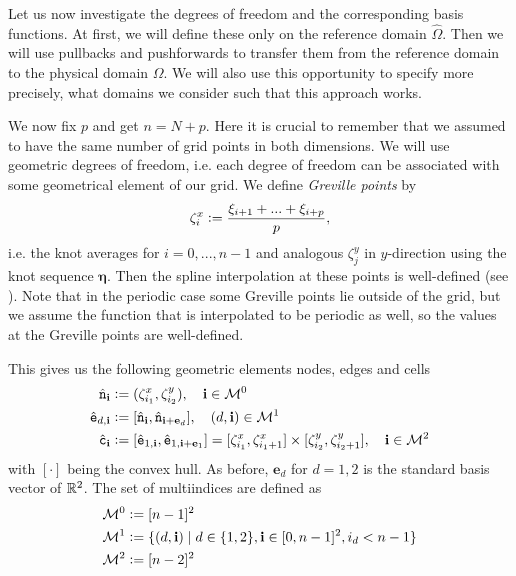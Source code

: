 \documentclass[../master_thesis.tex]{subfiles}
\begin{document}
Let us now investigate the degrees of freedom and the corresponding basis functions. 
At first, we will define these only on the 
reference domain $\hat{\Omega}$. Then we will use
pullbacks and pushforwards to transfer them
from the reference domain to the physical domain $\Omega$. 
We will also use this opportunity to specify more precisely, what domains we consider 
such that this approach works.

We now fix $p$ and get $n = N+p$. Here it is crucial to remember that we assumed to 
have the same number of grid points in both dimensions.
We will use geometric degrees of 
freedom, i.e. each degree of freedom can be associated with some geometrical element of our 
grid. We define \textit{Greville points} by 
\begin{align*}
    \zeta_i^x \vcentcolon= \frac{\xi_{i+1} + ... + \xi_{i+p}}{p},
\end{align*}
i.e. the knot averages for $i=0,...,n-1$ and analogous $\zeta_j^y$ in $y$-direction 
using the knot sequence $\bm{\eta}$. 
Then the spline interpolation at these 
points is well-defined (see \cite[Sec.\,3.3.1]{isogeometric_analysis}).
Note that in the periodic case some Greville points lie outside of 
the grid, but we assume the function that is interpolated to be periodic as well, so
the values at the Greville points are well-defined.

This gives us the following geometric elements nodes, edges and cells
\begin{align*}
    \hat{\mathtt{n}}_\mathbf{i} &\vcentcolon= (\zeta^x_{i_1}, \zeta^y_{i_2}), \quad \mathbf{i} \in \mathcal{M}^0
    \\ \hat{\mathtt{e}}_{d,\mathbf{i}} 
        &\vcentcolon= [\hat{\mathtt{n}}_\mathbf{i}, \hat{\mathtt{n}}_{\mathbf{i} + \mathbf{e}_d}] 
        , \quad (d, \mathbf{i}) \in \mathcal{M}^1
    \\ \hat{\mathtt{c}}_\mathbf{i} &\vcentcolon= [\hat{\mathtt{e}}_{1,\mathbf{i}}, \hat{\mathtt{e}}_{1,\mathbf{i} + \mathbf{e}_1}]
        = [\zeta^x_{i_1}, \zeta^x_{i_1+1}] \times [\zeta^y_{i_2}, \zeta^y_{i_2+1}] 
        , \quad \mathbf{i} \in \mathcal{M}^2 
\end{align*}
with $[\cdot]$ being the convex hull. As before, $\mathbf{e}_d$ for $d = 1,2$ is the 
standard basis vector of $\mathbb{R}^2$. 
The set of multiindices are defined as
\begin{align*}
    \mathcal{M}^0 &\vcentcolon= [n-1]^2
    \\ \mathcal{M}^1 &\vcentcolon= \{ (d, \mathbf{i}) \mid d \in \{1,2\}, \mathbf{i} \in [0,n-1]^2, i_d < n-1 \}
    \\ \mathcal{M}^2 &\vcentcolon= [n-2]^2
\end{align*}
\end{document}
